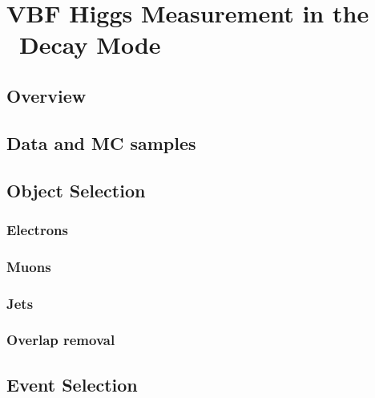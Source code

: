 \chapter{VBF Higgs Measurement in the \wwlnln~Decay Mode}
\label{chap:analysis}


\section{Overview}

%

\section{Data and MC samples}

%

\section{Object Selection}
\subsection{Electrons}

\subsection{Muons}

\subsection{Jets}

\subsection{Overlap removal}

\subsection{\etmiss}

\section{Event Selection}


